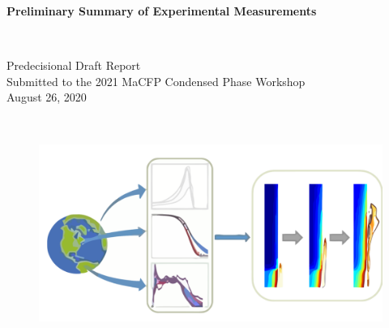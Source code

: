 \documentclass{book}
\begin{document}

\thispagestyle{empty}


\vspace*{0.75in}

\begin{center}
\begin{Large}
{\bf Preliminary Summary of Experimental Measurements} \\
\end{Large}
\hspace{1in} \\
\end{center}

\begin{center}
\begin{large}
Predecisional Draft Report\\
Submitted to the 2021 MaCFP Condensed Phase Workshop \\
August 26, 2020 \\
\end{large}
\hspace{2in} \\
\end{center}

\begin{figure}[h]
  \centering
  \includegraphics[width=6in]{FIGURES/MaCFP_Logo}
  \label{Cover_Image}
\end{figure}

\vfill
\end{document}
